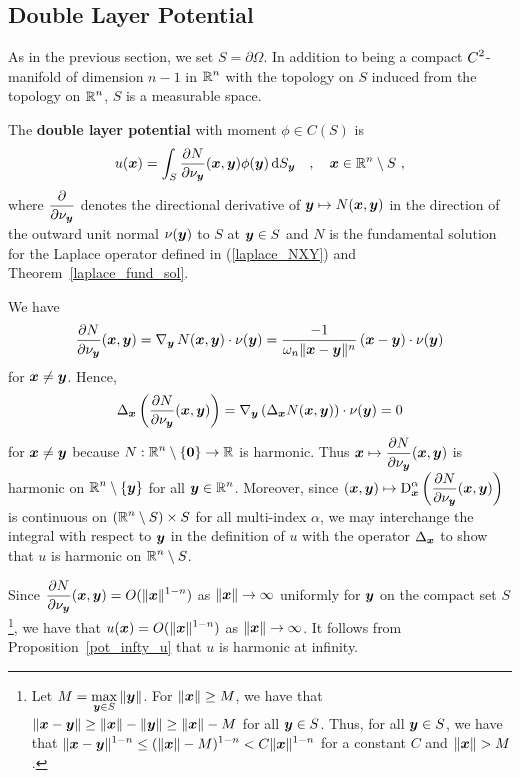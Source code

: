 \subsection{Double Layer Potential}

As in the previous section, we set $S = \partial \Omega$.  In addition
to being a compact $\displaystyle C^2$-manifold of dimension $n-1$ in
$\displaystyle \mathbb{R}^n$ with the topology on $S$ induced from the
topology on $\displaystyle \mathbb{R}^n$, $S$ is a measurable space.

\begin{defn} \label{pot_dblp_def}
The {\bfseries double layer potential} with moment $\phi \in C(S)$ is
\[
u({\bm{x}}) = \int_S
\frac{\partial{N}}{\partial \nu_{{\bm{y}}}}({\bm{x}},{\bm{y}}) \phi({\bm{y}}) \,\mathrm{d}{S}_{{\bm{y}}}
\quad , \quad {\bm{x}} \in \mathbb{R}^n \setminus S \ ,
\]
where $\displaystyle \frac{\partial{}}{\partial \nu_{{\bm{y}}}}$ denotes the
directional derivative of ${\bm{y}} \mapsto N({\bm{x}},{\bm{y}})$ in the
direction of the outward unit normal $\nu({\bm{y}})$ to
$S$ at ${\bm{y}} \in S$ and $N$ is the fundamental solution for
the Laplace operator defined in (\ref{laplace_NXY}) and
Theorem~\ref{laplace_fund_sol}.
\end{defn}

We have
\[
\frac{\partial{N}}{\partial \nu_{{\bm{y}}}}({\bm{x}},{\bm{y}}) =
\operatorname{\nabla}_{{\bm{y}}} N({\bm{x}},{\bm{y}}) \cdot \nu({\bm{y}}) =
\frac{-1}{\omega_n \|{\bm{x}}-{\bm{y}}\|^n}\,({\bm{x}}-{\bm{y}})
\cdot \nu({\bm{y}})
\]
for ${\bm{x}} \neq {\bm{y}}$.  Hence,
\[
\Delta_{{\bm{x}}} \left(\frac{\partial{N}}{\partial \nu_{{\bm{y}}}}({\bm{x}},{\bm{y}})\right) =
\operatorname{\nabla}_{{\bm{y}}} \left( \Delta_{{\bm{x}}} N({\bm{x}},{\bm{y}}) \right) \cdot
\nu({\bm{y}}) = 0
\]
for ${\bm{x}} \neq {\bm{y}}$ because
$\displaystyle N:\mathbb{R}^n \setminus \{ {\bm{0}} \} \to \mathbb{R}$ is harmonic.
Thus
$\displaystyle {\bm{x}} \mapsto \frac{\partial{N}}{\partial \nu_{{\bm{y}}}}({\bm{x}},{\bm{y}})$
is harmonic on $\displaystyle \mathbb{R}^n\setminus \{{\bm{y}}\}$ for all
$\displaystyle {\bm{y}} \in \mathbb{R}^n$.  Moreover, since 
$\displaystyle ({\bm{x}},{\bm{y}}) \mapsto
\operatorname{D}^\alpha_{{\bm{x}}}
\left(\frac{\partial{N}}{\partial \nu_{{\bm{y}}}}({\bm{x}},{\bm{y}})\right)$
is continuous on $\displaystyle (\mathbb{R}^n\setminus S)\times S$ for all
multi-index $\alpha$, we may interchange the integral with respect to
${\bm{y}}$ in the definition of $u$ with the operator
$\Delta_{{\bm{x}}}$ to show that $u$ is harmonic on
$\displaystyle \mathbb{R}^n \setminus S$. 

Since
$\displaystyle 
\frac{\partial{N}}{\partial \nu_{{\bm{y}}}}({\bm{x}},{\bm{y}}) = O(\|{\bm{x}}\|^{1-n})$
as $\|{\bm{x}}\| \rightarrow \infty$ uniformly for ${\bm{y}}$ on the
compact set $S$ \footnote{
Let $\displaystyle M = \max_{{\bm{y}} \in S} \|{\bm{y}}\|$.
For $\|{\bm{x}}\| \geq M$, we have that
$\|{\bm{x}}-{\bm{y}}\| \geq \|{\bm{x}}\| - \|{\bm{y}}\| \geq \|{\bm{x}}\| - M$
for all ${\bm{y}} \in S$.  Thus, for all ${\bm{y}} \in S$,
we have that $\displaystyle \|{\bm{x}} - {\bm{y}}\|^{1-n}
\leq (\|{\bm{x}}\| - M)^{1-n} < C \|{\bm{x}}\|^{1-n}$ 
for a constant $C$ and $\|{\bm{x}}\| > M$.}, we have that
$\displaystyle u({\bm{x}}) = O(\|{\bm{x}}\|^{1-n})$
as $\|{\bm{x}}\| \rightarrow \infty$.
It follows from Proposition~\ref{pot_infty_u} that $u$ is harmonic at
infinity.

